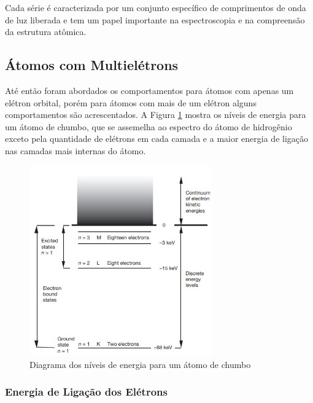 \documentclass[11pt,a4paper]{article}
\begin{document}
                Cada série é caracterizada por um conjunto específico de comprimentos de onda de luz liberada e tem um papel importante na espectroscopia e na compreensão da estrutura atômica.

            

        \subsection{Átomos com Multielétrons}
            
            Até então foram abordados os comportamentos para átomos com apenas um elétron orbital, porém para átomos com mais de um elétron alguns comportamentos são acrescentados. A Figura \ref{fig:diagramaNiveisDeEnergiaParaAtomosMultieletrons} mostra os níveis de energia para um átomo de chumbo, que se assemelha ao espectro do átomo de hidrogênio exceto pela quantidade de elétrons em cada camada e a maior energia de ligação nas camadas mais internas do átomo.

                \begin{figure}[h]
                    \centering
                    \includegraphics[width=0.7\textwidth]{Imagens/diagramaNiveisDeEnergiaParaAtomosMultieletrons.jpg}
                    \caption{Diagrama dos níveis de energia para um átomo de chumbo}
                    \label{fig:diagramaNiveisDeEnergiaParaAtomosMultieletrons}
                \end{figure}

            \subsubsection{Energia de Ligação dos Elétrons}
\end{document}
